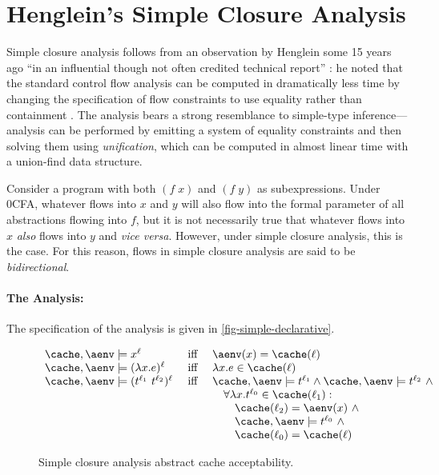 \section{Henglein's Simple Closure Analysis}
\label{sec:simple}

Simple closure analysis follows from an observation by Henglein some
15 years ago ``in an influential though not often credited technical
report'' \cite[page 4]{midtgaard-07}: he noted that the standard
control flow analysis can be computed in dramatically less time by
changing the specification of flow constraints to use equality rather
than containment \cite{henglein92d}.  The analysis bears a strong
resemblance to simple-type inference---analysis can be performed by
emitting a system of equality constraints and then solving them using
{\em unification}, which can be computed in almost linear time with a
union-find data structure.

Consider a program with both $(f\;x)$ and $(f\;y)$ as subexpressions.
Under 0CFA, whatever flows into $x$ and $y$ will also flow into the
formal parameter of all abstractions flowing into $f$, but it is not
necessarily true that whatever flows into $x$ {\em also} flows into
$y$ and {\em vice versa}.  However, under simple closure analysis,
this is the case.  For this reason, flows in simple closure analysis
are said to be {\em bidirectional}.

\paragraph{The Analysis:} 

The specification of the analysis is given in
\autoref{fig-simple-declarative}.

\begin{figure}[h]
\begin{displaymath}
\begin{array}{lcl}
\cache,\aenv \models x^\ell & 
\mbox{ iff } &
\aenv(x) = \cache(\ell)\\
\cache,\aenv \models (\lambda x .e)^\ell &
\mbox{ iff } &
\lambda x.e \in \cache(\ell)\\
\cache,\aenv \models (t^{\ell_1}\ t^{\ell_2})^\ell & 
\mbox{ iff } &
\cache,\aenv \models t^{\ell_1} \wedge \cache,\aenv \models t^{\ell_2}\ \wedge\\
\ & \ & \quad \forall \lambda x.t^{\ell_0} \in \cache(\ell_1) : \\
\ & \ & \qquad \cache(\ell_2) = \aenv(x)\ \wedge\\
\ & \ & \qquad \cache,\aenv \models t^{\ell_0}\ \wedge \\
\ & \ & \qquad \cache(\ell_0) = \cache(\ell)
\end{array}
\end{displaymath}
\caption{Simple closure analysis abstract cache acceptability.}
\label{fig-simple-declarative}
\end{figure}


